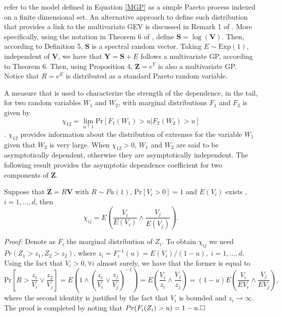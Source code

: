 \cite{ferreira2014} refer to the model defined in Equation \eqref{MGP} as a simple 
Pareto process indexed on a finite dimensional set. An alternative approach to 
define such distribution that provides a link to the multivariate GEV is discussed 
in Remark 1 of \cite{RoSeWa2018a}. More specifically, 
using the notation in Theorem 6 of \cite{RoSeWa2018a}, define $\bm{S} = \log(\bm{V})$. 
Then, according to Definition 5, $\bm{S}$ is a spectral random vector. Taking 
$E \sim \text{Exp}(1)$, independent of $\bm{V}$, we have that $\bm{Y} = \bm{S} + E$ 
follows a multivariate GP, according to Theorem 6.  Then, using Proposition 4, 
$\bm{Z} = e^{Y}$ is also a multivariate GP. Notice that $R = e^E$ is distributed as 
a standard Pareto random variable.

A measure that is used to characterize the strength of the dependence,
in the tail, for two random variables $W_1$ and $W_2$, with marginal
distributions $F_1$ and $F_2$ is given by
\[	\chi_{12} = \lim_{u\uparrow 1} \text{Pr}[ F_1(W_1)>u|F_2(W_2)>u]  \]
\citep{coles2001}.
$\chi_{12}$ provides information about the distribution of extremes for the variable $W_1$
given that $W_2$ is very large.  When $\chi_{12}>0$, $W_1$ and $W_2$ 
are said to
be asymptotically dependent, otherwise they are asymptotically
independent. The following result provides the asymptotic dependence coefficient for two components of $\bm{Z}$. 
\begin{prop} \label{ppchi}
Suppose that $\bm{Z} = R\bm{V}$ with $R\sim Pa(1)$,
$\text{Pr}[V_i>0] = 1$ and $E(V_i)$ exists ,
$i=1, \ldots ,d$, then
\begin{equation}
	\chi_{ij} = E\left(\frac{V_i}{E(V_i)} \wedge 
\frac{V_j}{E(V_j)}\right).
\end{equation}
\end{prop}
{\em Proof:}
Denote as $F_i$ the marginal distribution of $Z_i$. To obtain $\chi_{ij}$ we need $Pr(Z_1>z_1,Z_2>z_2)$, where $z_i =
F_i^{-1}(u) = E(V_i)/(1 - u), \;i=1,\dots, d$.
Using the fact that
$V_i>0, \forall i$ almost surely, we have that the former is equal to
\[	\text{Pr}\left[R>\frac{z_i}{V_i}\vee\frac{z_2}{V_j}\right] =
E\left(1\wedge\left(\frac{z_i}{V_i}\vee\frac{z_j}{V_j}\right)
^{-1} \right)
= E\left( \frac{V_i}{z_i}\wedge\frac{V_j}{z_j}
\right) = (1 - u)E\left(
\frac{V_i}{EV_i}\wedge\frac{V_j}{EV_j}
\right) ,
\]
where the second identity is justified by the fact that $V_i$ is
bounded and $z_i\rightarrow\infty$. The proof is completed by noting
that $Pr(F_i(Z_i)>u ) = 1 - u.\hfill\Box$

